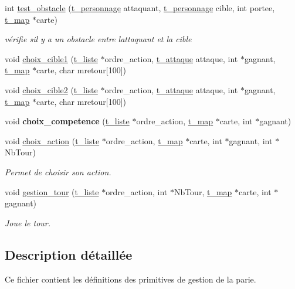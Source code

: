 \begin{DoxyCompactItemize}
\item 
int \hyperlink{a00021_a3f5ee88539cda4db0ce755f580c7d029}{test\+\_\+obstacle} (\hyperlink{a00010}{t\+\_\+personnage} attaquant, \hyperlink{a00010}{t\+\_\+personnage} cible, int portee, \hyperlink{a00008}{t\+\_\+map} $\ast$carte)
\begin{DoxyCompactList}\small\item\em vérifie s\textquotesingle{}il y a un obstacle entre l\textquotesingle{}attaquant et la cible \end{DoxyCompactList}\item 
void \hyperlink{a00021_a996472c0d70de400e560b835c47820d6}{choix\+\_\+cible1} (\hyperlink{a00007}{t\+\_\+liste} $\ast$ordre\+\_\+action, \hyperlink{a00004}{t\+\_\+attaque} attaque, int $\ast$gagnant, \hyperlink{a00008}{t\+\_\+map} $\ast$carte, char mretour\mbox{[}100\mbox{]})
\item 
void \hyperlink{a00021_a0fd6a7ce433977b4c02287981e5fce42}{choix\+\_\+cible2} (\hyperlink{a00007}{t\+\_\+liste} $\ast$ordre\+\_\+action, \hyperlink{a00004}{t\+\_\+attaque} attaque, int $\ast$gagnant, \hyperlink{a00008}{t\+\_\+map} $\ast$carte, char mretour\mbox{[}100\mbox{]})
\item 
void {\bfseries choix\+\_\+competence} (\hyperlink{a00007}{t\+\_\+liste} $\ast$ordre\+\_\+action, \hyperlink{a00008}{t\+\_\+map} $\ast$carte, int $\ast$gagnant)\hypertarget{a00021_aef9e64f9c90a01e6e0464bdc5a5a0869}{}\label{a00021_aef9e64f9c90a01e6e0464bdc5a5a0869}

\item 
void \hyperlink{a00021_a82b38c565e5644feb6eb0d1090177bbd}{choix\+\_\+action} (\hyperlink{a00007}{t\+\_\+liste} $\ast$ordre\+\_\+action, \hyperlink{a00008}{t\+\_\+map} $\ast$carte, int $\ast$gagnant, int $\ast$Nb\+Tour)
\begin{DoxyCompactList}\small\item\em Permet de choisir son action. \end{DoxyCompactList}\item 
void \hyperlink{a00021_ad221d44825f0b6dbae12c0460c6ff658}{gestion\+\_\+tour} (\hyperlink{a00007}{t\+\_\+liste} $\ast$ordre\+\_\+action, int $\ast$Nb\+Tour, \hyperlink{a00008}{t\+\_\+map} $\ast$carte, int $\ast$gagnant)
\begin{DoxyCompactList}\small\item\em Joue le tour. \end{DoxyCompactList}\end{DoxyCompactItemize}


\subsection{Description détaillée}
Ce fichier contient les définitions des primitives de gestion de la parie. 

